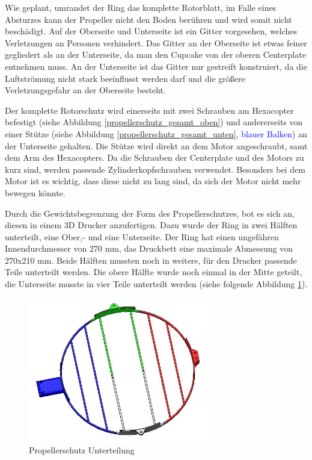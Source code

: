 	Wie geplant, umrandet der Ring das komplette Rotorblatt, im Falle eines Absturzes kann der Propeller nicht den Boden berühren und wird somit nicht beschädigt.
	Auf der Oberseite und Unterseite ist ein Gitter vorgesehen, welches Verletzungen an Personen verhindert.
	Das Gitter an der Oberseite ist etwas feiner gegliedert als an der Unterseite, da man den Cupcake von der oberen Centerplate entnehmen muss.
	An der Unterseite ist das Gitter nur gestreift konstruiert, da die Luftströmung nicht stark beeinflusst werden darf und die größere Verletzungsgefahr an der Oberseite besteht.

	Der komplette Rotorschutz wird einerseits mit zwei Schrauben am Hexacopter befestigt (siehe Abbildung \ref{propellerschutz_gesamt_oben}) und andererseits von einer Stütze (siehe Abbildung  \ref{propellerschutz_gesamt_unten},
	\textcolor{blue}{blauer Balken}) an der Unterseite gehalten. Die Stütze wird direkt an dem Motor angeschraubt, samt dem Arm des Hexacopters.
	Da die Schrauben der Centerplate und des Motors zu kurz sind, werden passende Zylinderkopfschrauben verwendet.
	Besonders bei dem Motor ist es wichtig, dass diese nicht zu lang sind, da sich der Motor nicht mehr bewegen könnte.

			\newpage

	Durch die Gewichtsbegrenzung \bzw der Form des Propellerschutzes, bot es sich an, diesen in einem 3D Drucker anzufertigen.
	Dazu wurde der Ring in zwei Hälften unterteilt, eine Ober,- und eine Unterseite.
	Der Ring hat einen ungefähren Innendurchmesser von 270 mm, das Druckbett eine maximale Abmessung von 270x210 mm.
	Beide Hälften mussten noch in weitere, für den Drucker passende Teile unterteilt werden.
	Die obere Hälfte wurde noch einmal in der Mitte geteilt, die Unterseite musste in vier Teile unterteilt werden (siehe folgende Abbildung \ref{propellerschutz_mitte_unterteilung}).

			\begin{figure}[tbh]
			\begin{centering}
			\includegraphics[width = 0.7\textwidth]{Bilder/propellerschutz_mitte_unterteilung}
			\par\end{centering}
			\caption{Propellerschutz Unterteilung}
			\label{propellerschutz_mitte_unterteilung}
			\end{figure}

